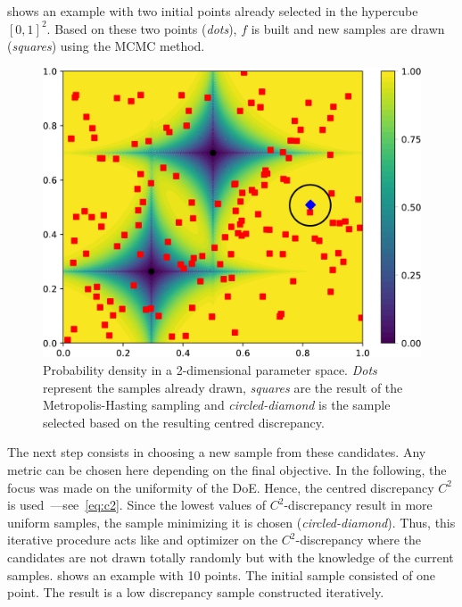  shows an example with two initial points already selected in the hypercube $[0, 1]^2$. Based on these two points (\emph{dots}), $f$ is built and new samples are drawn (\emph{squares}) using the MCMC method.

\begin{figure}[!ht]
\centering
\includegraphics[width=0.8\linewidth,keepaspectratio]{fig/contributions/doe/sampling_KDE.pdf}
\caption{Probability density in a 2-dimensional parameter space. \emph{Dots} represent the samples already drawn, \emph{squares} are the result of the Metropolis-Hasting sampling and \emph{circled-diamond} is the sample selected based on the resulting centred discrepancy.}
\label{fig:sample_kde}
\end{figure}

The next step consists in choosing a new sample from these candidates. Any metric can be chosen here depending on the final objective. In the following, the focus was made on the uniformity of the DoE. Hence, the centred discrepancy $C^2$ is used~\citep{Fang2006}---see~\cref{eq:c2}. Since the lowest values of $C^2$-discrepancy result in more uniform samples, the sample minimizing it is chosen (\emph{circled-diamond}). Thus, this iterative procedure acts like and optimizer on the $C^2$-discrepancy where the candidates are not drawn totally randomly but with the knowledge of the current samples.  shows an example with 10 points. The initial sample consisted of one point. The result is a low discrepancy sample constructed iteratively.

